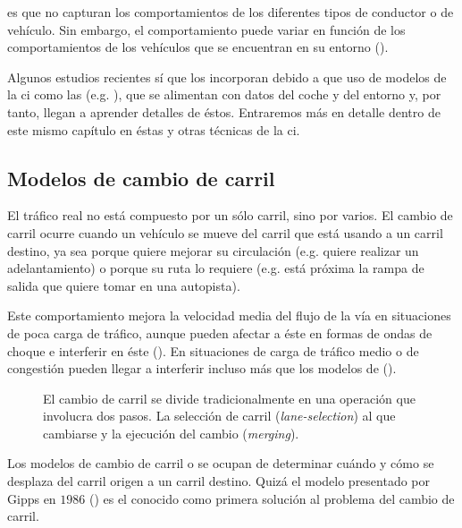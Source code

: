  es que no capturan los comportamientos de los diferentes tipos de conductor o de vehículo. Sin embargo, el comportamiento puede variar en función de los comportamientos de los vehículos que se encuentran en su entorno (\cite{Tordeux2010}).

Algunos estudios recientes sí que los incorporan debido a que uso de modelos de la \gls{ci} como las  (e.g. \cite{Simonelli2009, Fusco2013}), que se alimentan con datos del coche y del entorno y, por tanto, llegan a aprender detalles de éstos. Entraremos más en detalle dentro de este mismo capítulo en éstas y otras técnicas de la \gls{ci}.

\subsection{Modelos de cambio de carril}

El tráfico real no está compuesto por un sólo carril, sino por varios. El cambio de carril ocurre cuando un vehículo se mueve del carril que está usando a un carril destino, ya sea porque quiere mejorar su circulación (e.g. quiere realizar un adelantamiento) o porque su ruta lo requiere (e.g. está próxima la rampa de salida que quiere tomar en una autopista).

Este comportamiento mejora la velocidad media del flujo de la vía en situaciones de poca carga de tráfico, aunque pueden afectar a éste en formas de ondas de choque e interferir en éste (\cite{Sasoh2002, Jin2006}). En situaciones de carga de tráfico medio o de congestión pueden llegar a interferir incluso más que los modelos de \textit{} (\cite{Laval2006}).

\begin{figure}
	\caption{El cambio de carril se divide tradicionalmente en una operación que involucra dos pasos. La selección de carril (\textit{lane-selection}) al que cambiarse y la ejecución del cambio (\textit{merging}).}
	\label{fig:lane-selection-plus-merging}
\end{figure}

Los modelos de cambio de carril o \textit{} se ocupan de determinar cuándo y cómo se desplaza del carril origen a un carril destino. Quizá el modelo presentado por Gipps en $1986$ (\cite{Gipps1986}) es el conocido como primera solución al problema del cambio de carril.

